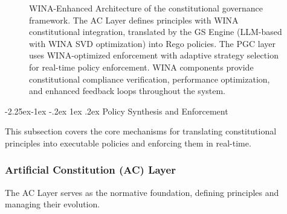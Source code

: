 \documentclass[manuscript,screen,review,anonymous,9pt]{acmart}
\makeatletter
\renewcommand\subsection{\@startsection{subsection}{2}{\z@}%
  {-2.25ex\@plus -1ex \@minus -.2ex}%
  {1ex \@plus .2ex}%
  {\normalfont\large\bfseries}}
\makeatother
\begin{document}
\begin{figure}[htbp]
  \centering
  \caption[WINA-enhanced architecture diagram]{WINA-Enhanced Architecture of the constitutional governance framework. The AC Layer defines principles with WINA constitutional integration, translated by the GS Engine (LLM-based with WINA SVD optimization) into Rego policies. The PGC layer uses WINA-optimized enforcement with adaptive strategy selection for real-time policy enforcement. WINA components provide constitutional compliance verification, performance optimization, and enhanced feedback loops throughout the system.}
  \label{fig:architecture}
\end{figure}

\subsection{Policy Synthesis and Enforcement}
\label{subsec:policy_synthesis_enforcement}

This subsection covers the core mechanisms for translating constitutional principles into executable policies and enforcing them in real-time.

\subsubsection{Artificial Constitution (AC) Layer}
The AC Layer serves as the normative foundation, defining principles and managing their evolution.
\end{document}
